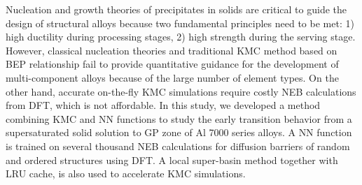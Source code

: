\begin{comment}
\begingroup
\begin{figure}[!ht]
  \centering
  \subfigure[]{\texttt{[image: ]}}\label{Chap:Al/Vac:fig:}
  \subfigure[]{\texttt{[image: ]}}\label{Chap:Al/Vac:fig:}
\caption[]{}
  \label{Chap:Al/Vac:fig}
\end{figure}
\endgroup
\end{comment}

Nucleation and growth theories of precipitates in solids are critical to guide the design of structural alloys because two fundamental principles need to be met: 1) high ductility during processing stages, 2) high strength during the serving stage. However, classical nucleation theories and traditional \ac{KMC} method based on \acf{BEP} relationship fail to provide quantitative guidance for the development of multi-component alloys because of the large number of element types. On the other hand, accurate on-the-fly \ac{KMC} simulations require costly \ac{NEB} calculations from \ac{DFT}, which is not affordable. In this study, we developed a method combining \ac{KMC} and \ac{NN} functions to study the early transition behavior from a supersaturated solid solution to \ac{GP} zone of Al 7000 series alloys. A \ac{NN} function is trained on several thousand \ac{NEB} calculations for diffusion barriers of random and ordered structures using \ac{DFT}. A local super-basin method together with \ac{LRU} cache, is also used to accelerate \ac{KMC} simulations.





